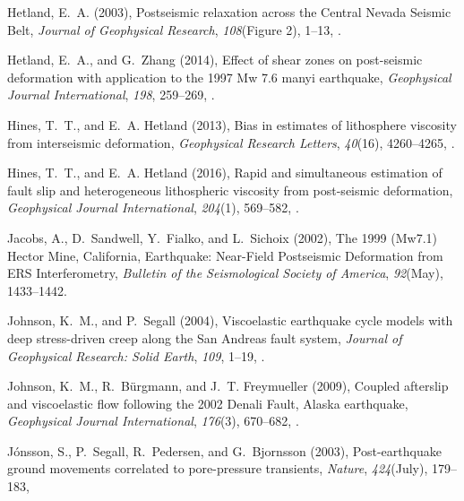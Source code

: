 \documentclass[draft,linenumbers]{AGUJournal}
\begin{document}
\begin{thebibliography}{52}
Hetland, E.~A. (2003), {Postseismic relaxation across the Central Nevada
  Seismic Belt}, \textit{Journal of Geophysical Research}, \textit{108}(Figure
  2), 1--13, .

Hetland, E.~A., and G.~Zhang (2014), {Effect of shear zones on post-seismic
  deformation with application to the 1997 Mw 7.6 manyi earthquake},
  \textit{Geophysical Journal International}, \textit{198}, 259--269,
  .

Hines, T.~T., and E.~A. Hetland (2013), {Bias in estimates of lithosphere
  viscosity from interseismic deformation}, \textit{Geophysical Research
  Letters}, \textit{40}(16), 4260--4265, .

Hines, T.~T., and E.~A. Hetland (2016), {Rapid and simultaneous estimation of
  fault slip and heterogeneous lithospheric viscosity from post-seismic
  deformation}, \textit{Geophysical Journal International}, \textit{204}(1),
  569--582, .

Jacobs, A., D.~Sandwell, Y.~Fialko, and L.~Sichoix (2002), {The 1999 (Mw7.1)
  Hector Mine, California, Earthquake: Near-Field Postseismic Deformation from
  ERS Interferometry}, \textit{Bulletin of the Seismological Society of
  America}, \textit{92}(May), 1433--1442.

Johnson, K.~M., and P.~Segall (2004), {Viscoelastic earthquake cycle models
  with deep stress-driven creep along the San Andreas fault system},
  \textit{Journal of Geophysical Research: Solid Earth}, \textit{109}, 1--19,
  .

Johnson, K.~M., R.~B{\"{u}}rgmann, and J.~T. Freymueller (2009), {Coupled
  afterslip and viscoelastic flow following the 2002 Denali Fault, Alaska
  earthquake}, \textit{Geophysical Journal International}, \textit{176}(3),
  670--682, .

J{\'{o}}nsson, S., P.~Segall, R.~Pedersen, and G.~Bjornsson (2003),
  {Post-earthquake ground movements correlated to pore-pressure transients},
  \textit{Nature}, \textit{424}(July), 179--183, 


\end{thebibliography}
\end{document}
